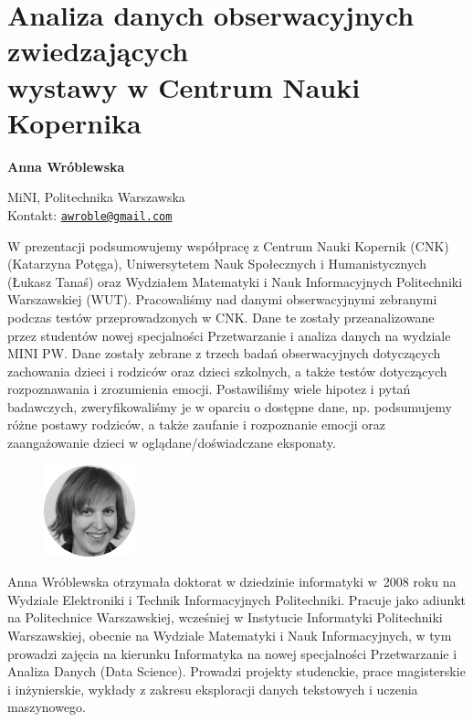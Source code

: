 \documentclass[\main/boa.tex]{subfiles}
\begin{document}
\section[Analiza danych obserwacyjnych zwiedzających wystawy w Centrum Nauki Kopernika]{Analiza danych obserwacyjnych zwiedzających \\wystawy w Centrum Nauki Kopernika}


\begin{minipage}{0.915\textwidth}
	\centering
  {\bf \LARGE {} Anna Wróblewska}
\end{minipage}


\begin{affiliations}
\begin{minipage}{0.915\textwidth}
\centering
\large MiNI, Politechnika Warszawska  \\[1pt]
Kontakt: \href{mailto:awroble@gmail.com}{\nolinkurl{awroble@gmail.com}}\\
\end{minipage}
\end{affiliations}

W prezentacji podsumowujemy współpracę z Centrum Nauki Kopernik (CNK) \break (Katarzyna Potęga), Uniwersytetem Nauk Społecznych i Humanistycznych (Łukasz Tanaś) oraz Wydziałem Matematyki i Nauk Informacyjnych Politechniki Warszawskiej (WUT). Pracowaliśmy nad danymi obserwacyjnymi zebranymi podczas testów przeprowadzonych w CNK. Dane te zostały przeanalizowane przez studentów nowej specjalności \break Przetwarzanie i analiza danych na wydziale MINI PW.
Dane zostały zebrane z trzech badań obserwacyjnych dotyczących zachowania dzieci i rodziców oraz dzieci szkolnych, a także testów dotyczących rozpoznawania i zrozumienia emocji.
Postawiliśmy wiele hipotez i pytań badawczych, zweryfikowaliśmy je w oparciu o dostępne dane, np. podsumujemy różne postawy rodziców, a także zaufanie i rozpoznanie emocji oraz zaangażowanie dzieci w oglądane/doświadczane eksponaty. 

\bio
\begin{figure}
    \includegraphics[width=100px]{img/guests/czarno_biale/awroblewska.png}
\end{figure} 
Anna Wróblewska otrzymała doktorat w dziedzinie informatyki w~2008 roku na Wydziale Elektroniki i Technik Informacyjnych Politechniki. Pracuje jako adiunkt na Politechnice Warszawskiej, wcześniej w Instytucie Informatyki Politechniki Warszawskiej, obecnie na Wydziale Matematyki i Nauk Informacyjnych, w tym prowadzi zajęcia na kierunku Informatyka na nowej specjalności Przetwarzanie i Analiza Danych (Data Science). Prowadzi projekty studenckie, prace magisterskie i inżynierskie, wykłady z zakresu eksploracji danych tekstowych i uczenia maszynowego.
\end{document}
